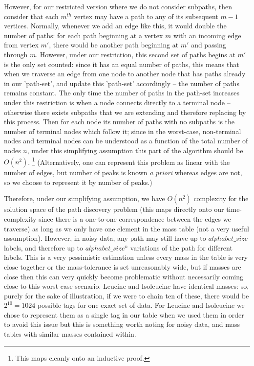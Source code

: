 \documentclass{l4proj}
\begin{document}
However, for our restricted version where we do not consider subpaths, then consider that each \(m^{th}\) vertex may have a path to any of its subsequent \(m-1\) vertices. Normally, whenever we add an edge like this, it would double the number of paths: for each path beginning at a vertex \(m\) with an incoming edge from vertex \(m'\), there would be another path beginning at \(m'\) and passing through \(m\). However, under our restriction, this second set of paths begins at \(m'\) is the only set counted: since it has an equal number of paths, this means that when we traverse an edge from one node to another node that has paths already in our 'path-set', and update this 'path-set' accordingly -- the number of paths remains constant. The only time the number of paths in the path-set increases under this restriction is when a node connects directly to a terminal node -- otherwise there exists subpaths that we are extending and therefore replacing by this process. Then for each node its number of paths with no subpaths is the number of terminal nodes which follow it; since in the worst-case, non-terminal nodes and terminal nodes can be understood as a function of the total number of nodes \(n\), under this simplifying assumption this part of the algorithm should be \(O(n^2)\). \footnote{This maps cleanly onto an inductive proof.} (Alternatively, one can represent this problem as linear with the number of edges, but number of peaks is known \textit{a priori} whereas edges are not, so we choose to represent it by number of peaks.)

Therefore, under our simplifying assumption, we have \(O(n^2)\) complexity for the solution space of the path discovery problem (this maps directly onto our time-complexity since there is a one-to-one correspondence between the edges we traverse) as long as we only have one element in the mass table (not a very useful assumption). However, in noisy data, any path may still have up to \(alphabet\_size\) labels, and therefore up to \(alphabet\_size^n\) variations of the path for different labels. This is a very pessimistic estimation unless every mass in the table is very close together or the mass-tolerance is set unreasonably wide, but if masses are close then this can very quickly become problematic without necessarily coming close to this worst-case scenario. Leucine and Isoleucine have identical masses: so, purely for the sake of illustration, if we were to chain ten of these, there would be \(2^{10} = 1024\) possible tags for one exact set of data. For Leucine and Isoleucine we chose to represent them as a single tag in our table when we used them in order to avoid this issue but this is something worth noting for noisy data, and mass tables with similar masses contained within.
\end{document}
